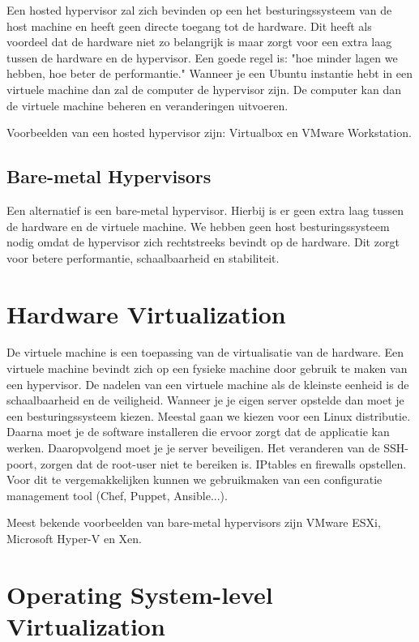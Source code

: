 \documentclass[pdftex,a4paper,12pt,twoside]{report}
\begin{document}
Een hosted hypervisor zal zich bevinden op een het besturingssysteem van de host machine en heeft geen directe toegang tot de hardware. Dit heeft als voordeel dat de hardware niet zo belangrijk is maar zorgt voor een extra laag tussen de hardware en de hypervisor. Een goede regel is: "hoe minder lagen we hebben, hoe beter de performantie." Wanneer je een Ubuntu instantie hebt in een virtuele machine dan zal de computer de hypervisor zijn. De computer kan dan de virtuele machine beheren en veranderingen uitvoeren.

Voorbeelden van een hosted hypervisor zijn: Virtualbox en VMware Workstation.

\subsection{Bare-metal Hypervisors}

Een alternatief is een bare-metal hypervisor. Hierbij is er geen extra laag tussen de hardware en de virtuele machine. We hebben geen host besturingssysteem nodig omdat de hypervisor zich rechtstreeks bevindt op de hardware. Dit zorgt voor betere performantie, schaalbaarheid en stabiliteit.

\section{Hardware Virtualization}

De virtuele machine is een toepassing van de virtualisatie van de hardware. Een virtuele machine bevindt zich op een fysieke machine door gebruik te maken van een hypervisor. De nadelen van een virtuele machine als de kleinste eenheid is de schaalbaarheid en de veiligheid. Wanneer je je eigen server opstelde dan moet je een besturingssysteem kiezen. Meestal gaan we kiezen voor een Linux distributie. Daarna moet je de software installeren die ervoor zorgt dat de applicatie kan werken. Daaropvolgend moet je je server beveiligen. Het veranderen van de SSH-poort, zorgen dat de root-user niet te bereiken is. IPtables en firewalls opstellen. Voor dit te vergemakkelijken kunnen we gebruikmaken van een configuratie management tool (Chef, Puppet, Ansible...).

Meest bekende voorbeelden van bare-metal hypervisors zijn VMware ESXi, Microsoft Hyper-V en Xen.

\section{Operating System-level Virtualization}
\end{document}
